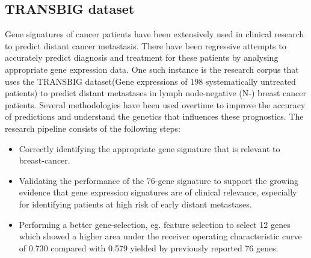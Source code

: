 \documentclass[13pt]{article}
\begin{document}
\subsection{TRANSBIG dataset}
Gene signatures of cancer patients have been extensively used in clinical research to predict distant cancer metastasis. There have been regressive attempts to accurately predict diagnosis and treatment for these patients by analysing appropriate gene expression data. One such instance is the research corpus that uses the TRANSBIG dataset(Gene expressions of 198 systematically untreated patients) to predict distant metastases in lymph node-negative (N-) breast cancer patients. Several methodologies have been used overtime to improve the accuracy of predictions and understand the genetics that influences these prognostics. The research pipeline consists of the following steps: 
\begin{itemize}
    \item Correctly identifying the appropriate gene signature that is relevant to breast-cancer. 
    \item Validating the performance of the 76-gene signature to support the growing evidence that gene expression signatures are of clinical relevance, especially for identifying patients at high risk of early distant metastases.
    \item Performing a better gene-selection, eg. feature selection to select 12 genes which showed a higher area under the receiver operating characteristic curve of 0.730 compared with 0.579 yielded by previously reported 76 genes.
    
\end{itemize}
\end{document}
